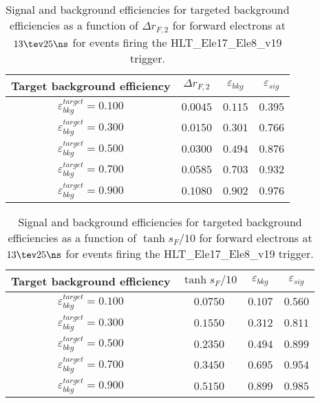 \clearpage

\begin{table}[!bht]
  \begin{center}
    \begin{tabular}{cccc}
      \hline
      Target background efficiency & $\Delta r_{F,2}$ & $\varepsilon_{bkg}$ & $\varepsilon_{sig}$ \\ 
      \hline
      $\varepsilon_{bkg}^{target} = 0.100$ & $  0.0045$ & $0.115$ & $0.395$ \\
      $\varepsilon_{bkg}^{target} = 0.300$ & $  0.0150$ & $0.301$ & $0.766$ \\
      $\varepsilon_{bkg}^{target} = 0.500$ & $  0.0300$ & $0.494$ & $0.876$ \\
      $\varepsilon_{bkg}^{target} = 0.700$ & $  0.0585$ & $0.703$ & $0.932$ \\
      $\varepsilon_{bkg}^{target} = 0.900$ & $  0.1080$ & $0.902$ & $0.976$ \\
      \hline
    \end{tabular}
    \caption{Signal and background efficiencies for targeted background efficiencies as a function of $\Delta r_{F,2}$ for forward electrons at $13\tev 25\ns$ for events firing the HLT\_Ele17\_Ele8\_v19 trigger.}
    \label{tab:eff_rej_r2F_beam_13_25_trigger_17_8_F}
  \end{center}
\end{table}

\clearpage

\begin{table}[!bht]
  \begin{center}
    \begin{tabular}{cccc}
      \hline
      Target background efficiency & $\tanh{s_F/10}$ & $\varepsilon_{bkg}$ & $\varepsilon_{sig}$ \\ 
      \hline
      $\varepsilon_{bkg}^{target} = 0.100$ & $  0.0750$ & $0.107$ & $0.560$ \\
      $\varepsilon_{bkg}^{target} = 0.300$ & $  0.1550$ & $0.312$ & $0.811$ \\
      $\varepsilon_{bkg}^{target} = 0.500$ & $  0.2350$ & $0.494$ & $0.899$ \\
      $\varepsilon_{bkg}^{target} = 0.700$ & $  0.3450$ & $0.695$ & $0.954$ \\
      $\varepsilon_{bkg}^{target} = 0.900$ & $  0.5150$ & $0.899$ & $0.985$ \\
      \hline
    \end{tabular}
    \caption{Signal and background efficiencies for targeted background efficiencies as a function of $\tanh{s_F/10}$ for forward electrons at $13\tev 25\ns$ for events firing the HLT\_Ele17\_Ele8\_v19 trigger.}
    \label{tab:eff_rej_sF_beam_13_25_trigger_17_8_F}
  \end{center}
\end{table}

